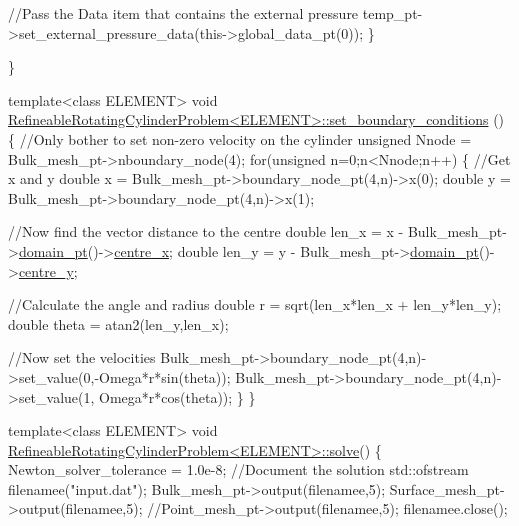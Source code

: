 \begin{DoxyCodeInclude}
      \textcolor{comment}{//Pass the Data item that contains the external pressure}
      temp\_pt->set\_external\_pressure\_data(this->global\_data\_pt(0));
     \}
   
\}

\textcolor{keyword}{template}<\textcolor{keyword}{class} ELEMENT>
\textcolor{keywordtype}{void} \hyperlink{classRefineableRotatingCylinderProblem_acd510f2c06fa3f38d2911781656dbf20}{RefineableRotatingCylinderProblem<ELEMENT>::set\_boundary\_conditions}
      ()
\{ 
 \textcolor{comment}{//Only bother to set non-zero velocity on the cylinder}
 \textcolor{keywordtype}{unsigned} Nnode = Bulk\_mesh\_pt->nboundary\_node(4);
 \textcolor{keywordflow}{for}(\textcolor{keywordtype}{unsigned} n=0;n<Nnode;n++)
  \{
   \textcolor{comment}{//Get x and y}
   \textcolor{keywordtype}{double} x = Bulk\_mesh\_pt->boundary\_node\_pt(4,n)->x(0);
   \textcolor{keywordtype}{double} y = Bulk\_mesh\_pt->boundary\_node\_pt(4,n)->x(1);

   \textcolor{comment}{//Now find the vector distance to the centre}
   \textcolor{keywordtype}{double} len\_x = x - Bulk\_mesh\_pt->\hyperlink{classCylinderAndInterfaceMesh_a924b3538d9f6c8b8524c317c5e2aa380}{domain\_pt}()->\hyperlink{classCylinderAndInterfaceDomain_a0b5aefe768267a1dff936ab491bee938}{centre\_x};
   \textcolor{keywordtype}{double} len\_y = y - Bulk\_mesh\_pt->\hyperlink{classCylinderAndInterfaceMesh_a924b3538d9f6c8b8524c317c5e2aa380}{domain\_pt}()->\hyperlink{classCylinderAndInterfaceDomain_ac461297e0b08287a1909f245569c77f0}{centre\_y};

   \textcolor{comment}{//Calculate the angle and radius}
   \textcolor{keywordtype}{double} r = sqrt(len\_x*len\_x + len\_y*len\_y);
   \textcolor{keywordtype}{double} theta = atan2(len\_y,len\_x);
   
   \textcolor{comment}{//Now set the velocities}
   Bulk\_mesh\_pt->boundary\_node\_pt(4,n)->set\_value(0,-Omega*r*sin(theta));
   Bulk\_mesh\_pt->boundary\_node\_pt(4,n)->set\_value(1, Omega*r*cos(theta));
  \}
\}

\textcolor{keyword}{template}<\textcolor{keyword}{class} ELEMENT>
\textcolor{keywordtype}{void} \hyperlink{classRefineableRotatingCylinderProblem_a664bfd373351a401619b06c3494fdcdc}{RefineableRotatingCylinderProblem<ELEMENT>::solve}()
\{ 
 Newton\_solver\_tolerance = 1.0e-8;
 \textcolor{comment}{//Document the solution}
 std::ofstream filenamee(\textcolor{stringliteral}{"input.dat"});
 Bulk\_mesh\_pt->output(filenamee,5);
 Surface\_mesh\_pt->output(filenamee,5);
 \textcolor{comment}{//Point\_mesh\_pt->output(filenamee,5);}
 filenamee.close();


\end{DoxyCodeInclude}
